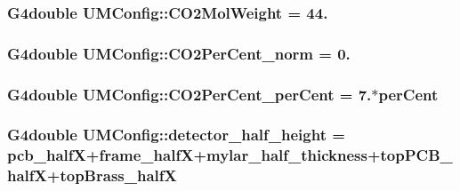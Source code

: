 \subsubsection[{C\+O2\+Mol\+Weight}]{\setlength{\rightskip}{0pt plus 5cm}G4double U\+M\+Config\+::\+C\+O2\+Mol\+Weight = 44.}\label{structUMConfig_ab4b67f65c87ddd62e28b0d49f407be31}
\hypertarget{structUMConfig_ad440ec0b6c4d101ea3828d8e2834d88a}{}
\subsubsection[{C\+O2\+Per\+Cent\+\_\+norm}]{\setlength{\rightskip}{0pt plus 5cm}G4double U\+M\+Config\+::\+C\+O2\+Per\+Cent\+\_\+norm = 0.}\label{structUMConfig_ad440ec0b6c4d101ea3828d8e2834d88a}
\hypertarget{structUMConfig_a114afe6135ce3eabf5edb22efd2ef1ac}{}
\subsubsection[{C\+O2\+Per\+Cent\+\_\+per\+Cent}]{\setlength{\rightskip}{0pt plus 5cm}G4double U\+M\+Config\+::\+C\+O2\+Per\+Cent\+\_\+per\+Cent = 7.$\ast$per\+Cent}\label{structUMConfig_a114afe6135ce3eabf5edb22efd2ef1ac}
\hypertarget{structUMConfig_a7884fd0bd17cd4d9e5ed778187face90}{}
\subsubsection[{detector\+\_\+half\+\_\+height}]{\setlength{\rightskip}{0pt plus 5cm}G4double U\+M\+Config\+::detector\+\_\+half\+\_\+height = {\bf pcb\+\_\+half\+X}+{\bf frame\+\_\+half\+X}+{\bf mylar\+\_\+half\+\_\+thickness}+{\bf top\+P\+C\+B\+\_\+half\+X}+{\bf top\+Brass\+\_\+half\+X}}\label{structUMConfig_a7884fd0bd17cd4d9e5ed778187face90}
\hypertarget{structUMConfig_a74bcad30686f23899c8b0326a30d95b0}{}
